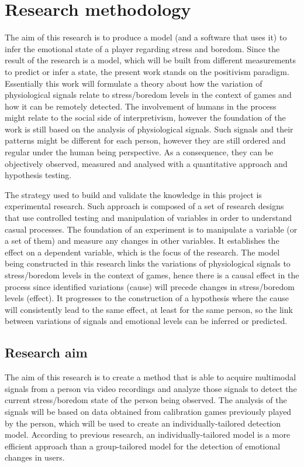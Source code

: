 \chapter{Research methodology}

The aim of this research is to produce a model (and a software that uses it) to infer the emotional state of a player regarding stress and boredom. Since the result of the research is a model, which will be built from different measurements to predict or infer a state, the present work stands on the positivism paradigm. Essentially this work will formulate a theory about how the variation of physiological signals relate to stress/boredom levels in the context of games and how it can be remotely detected. The involvement of humans in the process might relate to the social side of interpretivism, however the foundation of the work is still based on the analysis of physiological signals. Such signals and their patterns might be different for each person, however they are still ordered and regular under the human being perspective. As a consequence, they can be objectively observed, measured and analysed with a quantitative approach and hypothesis testing.

The strategy used to build and validate the knowledge in this project is experimental research. Such approach is composed of a set of research designs that use controlled testing and manipulation of variables in order to understand casual processes. The foundation of an experiment is to manipulate a variable (or a set of them) and measure any changes in other variables. It establishes the effect on a dependent variable, which is the focus of the research. The model being constructed in this research links the variations of physiological signals to stress/boredom levels in the context of games, hence there is a causal effect in the process since identified variations (cause) will precede changes in stress/boredom levels (effect). It progresses to the construction of a hypothesis where the cause will consistently lead to the same effect, at least for the same person, so the link between variations of signals and emotional levels can be inferred or predicted.

\section{Research aim}

The aim of this research is to create a method that is able to acquire multimodal signals from a person via video recordings and analyze those signals to detect the current stress/boredom state of the person being observed. The analysis of the signals will be based on data obtained from calibration games previously played by the person, which will be used to create an individually-tailored detection model. According to previous research, an individually-tailored model is a more efficient approach than a group-tailored model for the detection of emotional changes in users.

